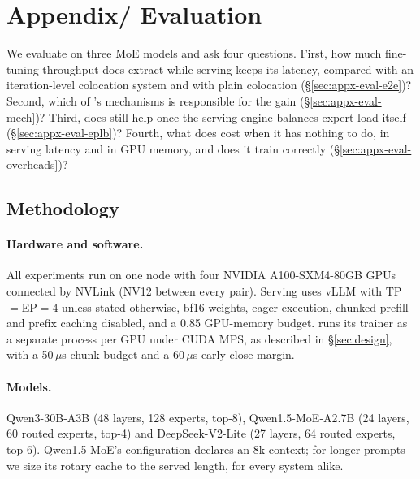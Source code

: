 \section{Appendix/ Evaluation}
\label{sec:appx-evaluation}
\acresetall

We evaluate \sys{} on three \ac{MoE} models and ask four questions.
First, how much fine-tuning throughput does \sys{} extract while serving
keeps its latency, compared with an iteration-level colocation system and
with plain colocation (\S\ref{sec:appx-eval-e2e})? Second, which of \sys{}'s
mechanisms is responsible for the gain (\S\ref{sec:appx-eval-mech})? Third, does
\sys{} still help once the serving engine balances expert load itself
(\S\ref{sec:appx-eval-eplb})? Fourth, what does \sys{} cost when it has nothing
to do, in serving latency and in GPU memory, and does it train correctly
(\S\ref{sec:appx-eval-overheads})?

\subsection{Methodology}
\label{sec:appx-eval-method}

\paragraph{Hardware and software.}
All experiments run on one node with four NVIDIA A100-SXM4-80GB GPUs connected
by NVLink (NV12 between every pair). Serving uses vLLM with \ac{TP}$=$\ac{EP}$=4$
unless stated otherwise, bf16 weights, eager execution, chunked prefill and
prefix caching disabled, and a 0.85 GPU-memory budget.
\sys{} runs its trainer as a separate process per GPU under CUDA MPS, as
described in \S\ref{sec:design}, with a 50\,$\mu$s chunk budget and a
60\,$\mu$s early-close margin.

\paragraph{Models.}
Qwen3-30B-A3B (48 layers, 128 experts, top-8), Qwen1.5-MoE-A2.7B (24 layers,
60 routed experts, top-4) and DeepSeek-V2-Lite (27 layers, 64 routed experts,
top-6). Qwen1.5-MoE's configuration declares an 8k context; for longer prompts
we size its rotary cache to the served length, for every system alike.

